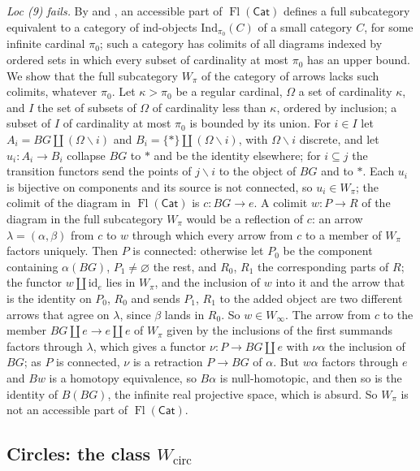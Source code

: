 \documentclass[11pt,a4paper]{article}
\theoremstyle{definition}
\newcommand{\Cat}{\mathsf{Cat}}
\newcommand{\Fl}{\operatorname{Fl}}
\newcommand{\Winf}{W_{\infty}}
\newcommand{\Wpi}{W_{\pi}}
\newcommand{\Wcirc}{W_{\mathrm{circ}}}
\newcommand{\id}{\mathrm{id}}
\begin{document}
\emph{Loc (9) fails.} By \cite[XVI, 5.2]{Der} and \cite[D\'ef.~4.13.1 and~4.8.7]{DerXVIII}, an
accessible part of $\Fl(\Cat)$ defines a full subcategory equivalent to a category of
ind-objects $\mathrm{Ind}_{\pi_0}(C)$ of a small category $C$, for some infinite cardinal
$\pi_0$; such a category has colimits of all diagrams indexed by ordered sets in which every
subset of cardinality at most $\pi_0$ has an upper bound. We show that the full subcategory
$\Wpi$ of the category of arrows lacks such colimits, whatever $\pi_0$. Let $\kappa>\pi_0$ be a
regular cardinal, $\Omega$ a set of cardinality $\kappa$, and $I$ the set of subsets of $\Omega$
of cardinality less than $\kappa$, ordered by inclusion; a subset of $I$ of cardinality at most
$\pi_0$ is bounded by its union. For $i\in I$ let $A_i=BG\amalg(\Omega\smallsetminus i)$ and
$B_i=\{\ast\}\amalg(\Omega\smallsetminus i)$, with $\Omega\smallsetminus i$ discrete, and let
$u_i\colon A_i\to B_i$ collapse $BG$ to $\ast$ and be the identity elsewhere; for $i\subseteq j$
the transition functors send the points of $j\smallsetminus i$ to the object of $BG$ and to
$\ast$. Each $u_i$ is bijective on components and its source is not connected, so
$u_i\in\Wpi$; the colimit of the diagram in $\Fl(\Cat)$ is $c\colon BG\to e$. A colimit
$w\colon P\to R$ of the diagram in the full subcategory $\Wpi$ would be a reflection of $c$:
an arrow $\lambda=(\alpha,\beta)$ from $c$ to $w$ through which every arrow from $c$ to a member
of $\Wpi$ factors uniquely. Then $P$ is connected: otherwise let $P_0$ be the component
containing $\alpha(BG)$, $P_1\ne\varnothing$ the rest, and $R_0$, $R_1$ the corresponding parts
of $R$; the functor $w\amalg\id_e$ lies in $\Wpi$, and the inclusion of $w$ into it and the
arrow that is the identity on $P_0$, $R_0$ and sends $P_1$, $R_1$ to the added object are two
different arrows that agree on $\lambda$, since $\beta$ lands in $R_0$. So $w\in\Winf$. The
arrow from $c$ to the member $BG\amalg e\to e\amalg e$ of $\Wpi$ given by the inclusions of
the first summands factors through $\lambda$, which gives a functor $\nu\colon P\to BG\amalg e$
with $\nu\alpha$ the inclusion of $BG$; as $P$ is connected, $\nu$ is a retraction $P\to BG$ of
$\alpha$. But $w\alpha$ factors through $e$ and $Bw$ is a homotopy equivalence, so $B\alpha$ is
null-homotopic, and then so is the identity of $B(BG)$, the infinite real projective space,
which is absurd. So $\Wpi$ is not an accessible part of $\Fl(\Cat)$.

\subsection{Circles: the class \texorpdfstring{$\Wcirc$}{W circ}}\label{subsec:wcirc}
\end{document}
